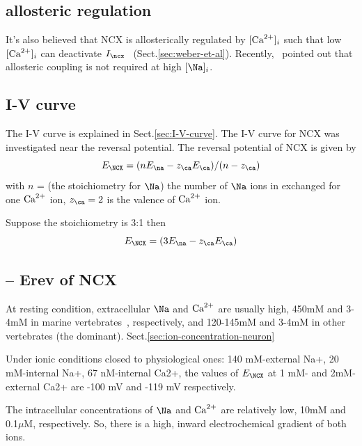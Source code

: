 \subsection{allosteric regulation}
\label{sec:NCX-allosteric-regulation}

It's also believed that NCX is allosterically regulated by $[{\text{Ca}^{2+}}]_i$ such that
low $[{\text{Ca}^{2+}}]_i$ can deactivate $I_\ncx$~\citep{miura1989}
(Sect.\ref{sec:weber-et-al}).
Recently,~\citep{urbanczyk2006} pointed out that allosteric coupling is not
required at high $[\Na]_i$.


\subsection{I-V curve}
\label{sec:I-V-curve-NCX}

The I-V curve is explained in Sect.\ref{sec:I-V-curve}. The I-V curve for NCX
was investigated near the reversal potential. The reversal potential of NCX is
given by
\begin{equation}
E_\NCX = (n E_\na - z_\ca E_\ca) / (n-z_\ca)
\end{equation}
with $n$ = (the stoichiometry for $\Na$) the number of $\Na$ ions in exchanged
for one ${\text{Ca}^{2+}}$ ion, $z_\ca=2$ is the valence of ${\text{Ca}^{2+}}$ ion.

Suppose the stoichiometry is 3:1 then
\begin{equation}
E_\NCX = (3 E_\na - z_\ca E_\ca) 
\end{equation}


\subsection{-- Erev of NCX}
\label{sec:equilibrium-ncx}


At resting condition, extracellular $\Na$ and ${\text{Ca}^{2+}}$ are usually high,
450mM and 3-4mM in marine vertebrates~\citep{blaustein1974},
respectively, and 120-145mM and 3-4mM in other vertebrates (the
dominant). Sect.\ref{sec:ion-concentration-neuron}

Under ionic conditions closed to physiological ones: 140 mM-external Na+, 20
mM-internal Na+, 67 nM-internal Ca2+, the values of $E_\NCX$ at 1 mM- and 2mM-
external Ca2+ are -100 mV and -119 mV respectively.

The intracellular concentrations of $\Na$ and ${\text{Ca}^{2+}}$ are relatively low, 10mM and
0.1$\mu$M, respectively. So, there is a high, inward electrochemical gradient of
both ions.

